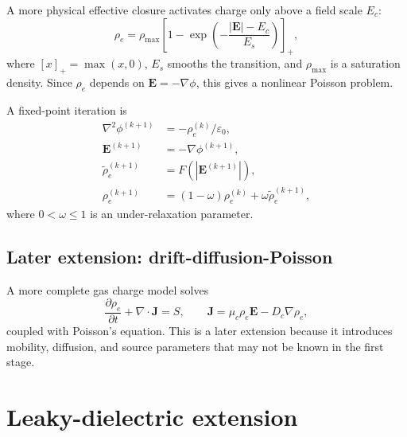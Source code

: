\documentclass[11pt]{article}
\newcommand{\eps}{\varepsilon}
\newcommand{\vE}{\mathbf{E}}
\newcommand{\vJ}{\mathbf{J}}
\newcommand{\grad}{\nabla}
\newcommand{\divg}{\nabla\!\cdot}
\newcommand{\abs}[1]{\left|#1\right|}
\begin{document}
A more physical effective closure activates charge only above a field scale \(E_c\):
\begin{equation}
    \rho_e
    =
    \rho_{\max}
    \left[1-\exp\left(-\frac{\abs{\vE}-E_c}{E_s}\right)\right]_+,
    \label{eq:threshold}
\end{equation}
where \([x]_+=\max(x,0)\), \(E_s\) smooths the transition, and \(\rho_{\max}\) is a saturation density.  Since \(\rho_e\) depends on \(\vE=-\grad\phi\), this gives a nonlinear Poisson problem.

A fixed-point iteration is
\begin{align}
    \nabla^2\phi^{(k+1)}&=-\rho_e^{(k)}/\eps_0,\\
    \vE^{(k+1)}&=-\grad\phi^{(k+1)},\\
    \widetilde\rho_e^{(k+1)}&=F(\abs{\vE^{(k+1)}}),\\
    \rho_e^{(k+1)}&=(1-\omega)\rho_e^{(k)}+\omega\widetilde\rho_e^{(k+1)},
\end{align}
where \(0<\omega\le1\) is an under-relaxation parameter.

\subsection{Later extension: drift-diffusion-Poisson}

A more complete gas charge model solves
\begin{equation}
    \frac{\partial\rho_e}{\partial t}+\divg\vJ=S,
    \qquad
    \vJ=\mu_c\rho_e\vE-D_c\grad\rho_e,
\end{equation}
coupled with Poisson's equation.  This is a later extension because it introduces mobility, diffusion, and source parameters that may not be known in the first stage.

\section{Leaky-dielectric extension}
\end{document}
